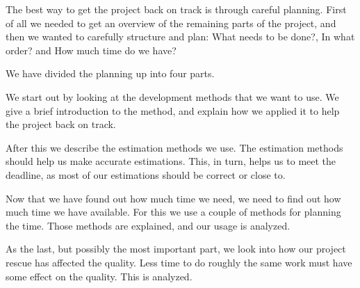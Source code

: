 The best way to get the project back on track is through careful planning. First of all we needed to get an overview of the remaining parts of the project, and then we wanted to carefully structure and plan: What needs to be done?, In what order? and How much time do we have?

We have divided the planning up into four parts.

We start out by looking at the development methods that we want to use. We give a brief introduction to the method, and explain how we applied it to help the project back on track.

After this we describe the estimation methods we use. The estimation methods should help us make accurate estimations. This, in turn, helps us to meet the deadline, as most of our estimations should be correct or close to.

Now that we have found out how much time we need, we need to find out how much time we have available. For this we use a couple of methods for planning the time. Those methods are explained, and our usage is analyzed.

As the last, but possibly the most important part, we look into how our project rescue has affected the quality. Less time to do roughly the same work must have some effect on the quality. This is analyzed.